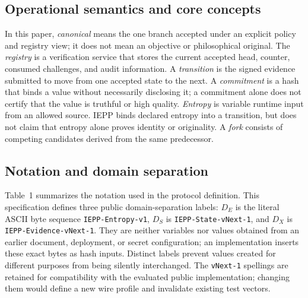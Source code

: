 \documentclass[11pt]{article}
\begin{document}
\subsection{Operational semantics and core concepts}
In this paper, \emph{canonical} means the one branch accepted under an explicit policy and registry view; it does not mean an objective or philosophical original. The \emph{registry} is a verification service that stores the current accepted head, counter, consumed challenges, and audit information. A \emph{transition} is the signed evidence submitted to move from one accepted state to the next. A \emph{commitment} is a hash that binds a value without necessarily disclosing it; a commitment alone does not certify that the value is truthful or high quality. \emph{Entropy} is variable runtime input from an allowed source. IEPP binds declared entropy into a transition, but does not claim that entropy alone proves identity or originality. A \emph{fork} consists of competing candidates derived from the same predecessor.

\subsection{Notation and domain separation}
Table~1 summarizes the notation used in the protocol definition. This specification defines three public domain-separation labels: $D_E$ is the literal ASCII byte sequence \texttt{IEPP-Entropy-v1}, $D_S$ is \texttt{IEPP-State-vNext-1}, and $D_X$ is \texttt{IEPP-Evidence-vNext-1}. They are neither variables nor values obtained from an earlier document, deployment, or secret configuration; an implementation inserts these exact bytes as hash inputs. Distinct labels prevent values created for different purposes from being silently interchanged. The \texttt{vNext-1} spellings are retained for compatibility with the evaluated public implementation; changing them would define a new wire profile and invalidate existing test vectors.
\end{document}
